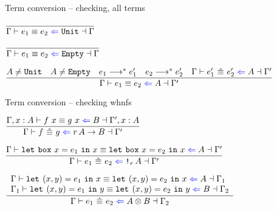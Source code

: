 \begin{frame}{Term conversion -- checking, all terms}

\begin{center}
  $\infrule{}{\checktermconv{\Gamma}{e_1}{e_2}{\Unit}{\Gamma}}$

  \vspace{2em}

  $\infrule{}{\checktermconv{\Gamma}{e_1}{e_2}{\Empty}{\Gamma}}$

  \vspace{2em}

  $\infrule{A \neq \Unit \quad A \neq \Empty \quad \reductions{e_1}{e_1'} \quad \reductions{e_2}{e_2'} \quad \checktermconvwhnf{\Gamma}{e_1'}{e_2'}{A}{\Gamma'}}{\checktermconv{\Gamma}{e_1}{e_2}{A}{\Gamma'}}$
\end{center}

\end{frame}

\begin{frame}{Term conversion -- checking whnfs}

\begin{center}
  $\infrule{\checktermconv{\extend{\Gamma}{x}{A}}{\app{f}{x}}{\app{g}{x}}{B}{\extend{\Gamma'}{x}{A}}}{\checktermconvwhnf{\Gamma}{f}{g}{\Fun[r]{A}{B}}{\Gamma'}}$

  \vspace{2em}

  $\infrule{\checktermconv{\Gamma}{\boxelim{x}{e_1}{x}}{\boxelim{x}{e_2}{x}}{A}{\Gamma'}}{\checktermconvwhnf{\Gamma}{e_1}{e_2}{\Box[r]{A}}{\Gamma'}}$

  \vspace{2em}

  $\infrule{\begin{array}{l} \checktermconv{\Gamma}{\letpair{x}{y}{e_1}{x}}{\letpair{x}{y}{e_2}{x}}{A}{\Gamma_1} \\ \checktermconv{\Gamma_1}{\letpair{x}{y}{e_1}{y}}{\letpair{x}{y}{e_2}{y}}{B}{\Gamma_2} \end{array}}{\checktermconvwhnf{\Gamma}{e_1}{e_2}{\Prod{A}{B}}{\Gamma_2}}$
\end{center}

\end{frame}

